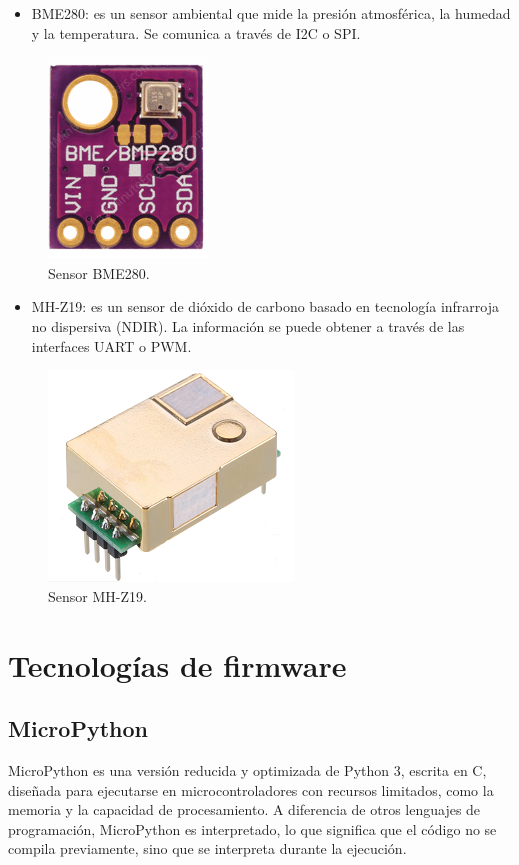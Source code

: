 \begin{itemize}
	\item BME280: es un sensor ambiental que mide la presión atmosférica, la humedad y la temperatura. Se comunica a través de I2C o SPI.\citep{sensor_bme280}
\end{itemize}

\begin{figure}[htpb]
    \centering
    \includegraphics[width=.2\textwidth]{./Figures/sensor_bme280.png}
    \caption{Sensor BME280.}
    \label{fig:bme280}
\end{figure}

\begin{itemize}
	\item MH-Z19: es un sensor de dióxido de carbono basado en tecnología infrarroja no dispersiva (NDIR). La información se puede obtener a través de las interfaces UART o PWM. \citep{sensor_mhz19}
\end{itemize}

\begin{figure}[htpb]
    \centering
    \includegraphics[width=.2\textwidth]{./Figures/sensor_mhz19.png}
    \caption{Sensor MH-Z19.}
    \label{fig:mhz19}
\end{figure}


\section{Tecnologías de firmware}

\subsection{MicroPython}

MicroPython es una versión reducida y optimizada de Python 3, escrita en C, diseñada para ejecutarse en microcontroladores con recursos limitados, como la memoria y  la capacidad de procesamiento. A diferencia de otros lenguajes de programación, MicroPython es interpretado, lo que significa que el código no se compila previamente, sino que se interpreta durante la ejecución.

